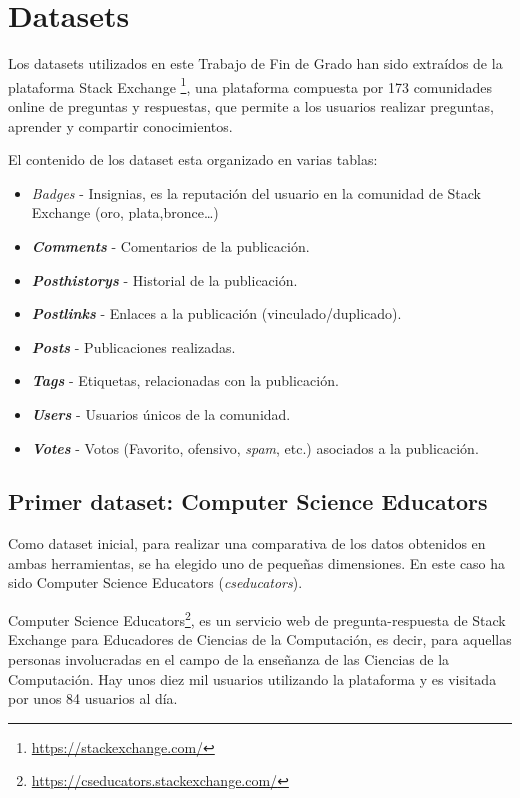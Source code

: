 \documentclass[a4paper, 12pt]{book}
\begin{document}
\clearpage

\section{Datasets}
\label{sec:datasets}

Los datasets utilizados en este Trabajo de Fin de Grado han sido extraídos de la plataforma Stack Exchange \footnote{\url{https://stackexchange.com/}}, una plataforma compuesta por 173 comunidades online de preguntas y respuestas, que permite a los usuarios realizar preguntas, aprender y compartir conocimientos.

El contenido de los dataset esta organizado en varias tablas: 
 \begin{itemize}
        \item \emph{Badges} - Insignias, es la reputación del usuario en la comunidad de Stack Exchange (oro, plata,bronce\ldots)
        \item \textbf{\emph{Comments}} - Comentarios de la publicación.
        \item \textbf{\emph{Posthistorys}} - Historial de la publicación.
        \item \textbf{\emph{Postlinks}} - Enlaces a la publicación (vinculado/duplicado).
        \item \textbf{\emph{Posts}} - Publicaciones realizadas.
        \item \textbf{\emph{Tags}} - Etiquetas, relacionadas con la publicación.
        \item \textbf{\emph{Users}} - Usuarios únicos de la comunidad. 
        \item \textbf{\emph{Votes}} - Votos (Favorito, ofensivo, \emph{spam}, etc.) asociados a la publicación. 
    \end{itemize}

\subsection{Primer dataset: Computer Science Educators}
\label{sec:cseducators} 
Como dataset inicial, para realizar una comparativa de los datos obtenidos en ambas herramientas, se ha elegido uno de pequeñas dimensiones. En este caso ha sido Computer Science Educators (\emph{cseducators}).

Computer Science Educators\footnote{\url{https://cseducators.stackexchange.com/}}, es un servicio web de pregunta-respuesta de Stack Exchange para Educadores de Ciencias de la Computación, es decir, para aquellas personas involucradas en el campo de la enseñanza de las Ciencias de la Computación. Hay unos diez mil usuarios utilizando la plataforma y es visitada por unos 84 usuarios al día.
\end{document}
